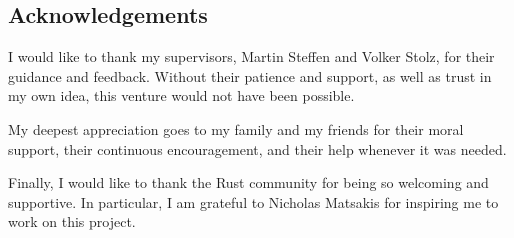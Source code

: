 \vspace*{2cm}
\thispagestyle{plain}

\begin{center}

{}

\section*{Acknowledgements}

\end{center}

I would like to thank my supervisors, Martin Steffen and Volker Stolz, for their guidance and feedback. Without their patience and support, as well as trust in my own idea, this venture would not have been possible.

My deepest appreciation goes to my family and my friends for their moral support, their continuous encouragement, and their help whenever it was needed.

Finally, I would like to thank the Rust community for being so welcoming and supportive. In particular, I am grateful to Nicholas Matsakis for inspiring me to work on this project.
